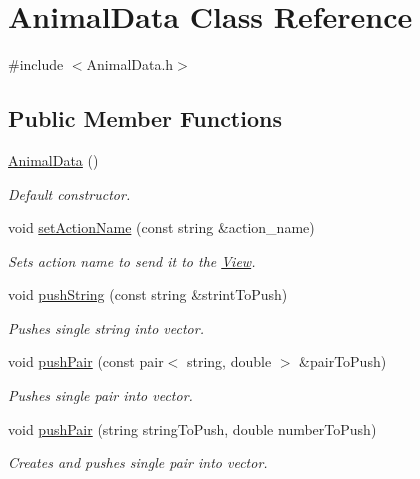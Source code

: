 \hypertarget{class_animal_data}{}\section{Animal\+Data Class Reference}
\label{class_animal_data}


{\ttfamily \#include $<$Animal\+Data.\+h$>$}

\subsection*{Public Member Functions}
\begin{DoxyCompactItemize}
\item 
\hyperlink{class_animal_data_a19d9316fa054fdf7908874ffb9f96b54}{Animal\+Data} ()
\begin{DoxyCompactList}\small\item\em Default constructor. \end{DoxyCompactList}\item 
void \hyperlink{class_animal_data_a742c6f639bfa120de88ef85afc2d3885}{set\+Action\+Name} (const string \&action\+\_\+name)
\begin{DoxyCompactList}\small\item\em Sets action name to send it to the \hyperlink{class_view}{View}. \end{DoxyCompactList}\item 
void \hyperlink{class_animal_data_ae9f122736669d294bcd03b9187d8552d}{push\+String} (const string \&strint\+To\+Push)
\begin{DoxyCompactList}\small\item\em Pushes single string into vector. \end{DoxyCompactList}\item 
void \hyperlink{class_animal_data_af36b185c412a509f897d7efbc32a3ab9}{push\+Pair} (const pair$<$ string, double $>$ \&pair\+To\+Push)
\begin{DoxyCompactList}\small\item\em Pushes single pair into vector. \end{DoxyCompactList}\item 
void \hyperlink{class_animal_data_a77cd6036400169c5c65b4e966c1eb7b4}{push\+Pair} (string string\+To\+Push, double number\+To\+Push)
\begin{DoxyCompactList}\small\item\em Creates and pushes single pair into vector. \end{DoxyCompactList}\item 

\end{DoxyCompactItemize}
